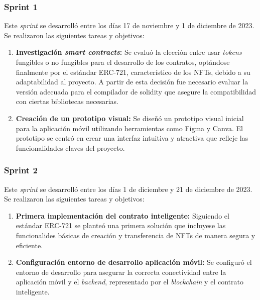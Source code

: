 \subsubsection{Sprint 1}

Este \textit{sprint} se desarrolló entre los días 17 de noviembre y 1 de diciembre de 2023. Se realizaron las siguientes tareas y objetivos:

\begin{enumerate}

\item \textbf{Investigación \textit{smart contracts}:} Se evaluó la elección entre usar \textit{tokens} fungibles o no fungibles para el desarrollo de los contratos, optándose finalmente por el estándar ERC-721, característico de los NFTs, debido a su adaptabilidad al proyecto.
A partir de esta decisión fue necesario evaluar la versión adecuada para el compilador de solidity que asegure la compatibilidad con ciertas bibliotecas necesarias.

\item \textbf{Creación de un prototipo visual:} Se diseñó un prototipo visual inicial para la aplicación móvil utilizando herramientas como Figma y Canva.
El prototipo se centró en crear una interfaz intuitiva y atractiva que refleje las funcionalidades claves del proyecto.

\end{enumerate}


\subsubsection{Sprint 2}

Este \textit{sprint} se desarrolló entre los días 1 de diciembre y 21 de diciembre de 2023. Se realizaron las siguientes tareas y objetivos:

\begin{enumerate}

\item \textbf{Primera implementación del contrato inteligente:} Siguiendo el estándar ERC-721 se planteó una primera solución que incluyese las funcionalides básicas de creación y transferencia de NFTs de manera segura y eficiente.

\item \textbf{Configuración entorno de desarrollo aplicación móvil:} Se configuró el entorno de desarrollo para asegurar la correcta conectividad entre la aplicación móvil y el \textit{backend}, representado por el \textit{blockchain} y el contrato inteligente.


\end{enumerate}


